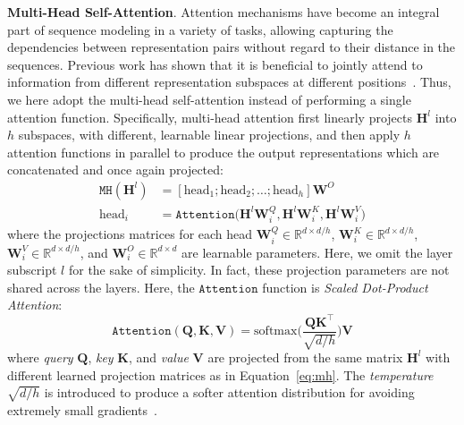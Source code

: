 \textbf{Multi-Head Self-Attention}.
Attention mechanisms have become an integral part of sequence modeling in a variety of tasks, allowing capturing the dependencies between representation pairs without regard to their distance in the sequences.
Previous work has shown that it is beneficial to jointly attend to information from different representation subspaces at different positions~\cite{Vaswani:nips2017:Attention,Li:emnlp2018:Multi,Devlin:2018:BERT}.
Thus, we here adopt the multi-head self-attention instead of performing a single attention function.
Specifically, multi-head attention first linearly projects $\bm{H}^l$ into $h$ subspaces, with different, learnable linear projections, and then apply $h$ attention functions in parallel to produce the output representations which are concatenated and once again projected:
\begin{equation}
    \begin{aligned}
        \mathtt{MH}(\bm{H}^{l}) &= [\text{head}_1; \text{head}_2; \dots; \text{head}_h]\bm{W}^{O} \\
        \text{head}_i &= \mathtt{Attention}\bigl(\bm{H}^l\bm{W}_i^Q, \bm{H}^l\bm{W}_i^K, \bm{H}^l\bm{W}_i^V \bigr)
    \end{aligned}
\label{eq:mh}
\end{equation} %
where the projections matrices for each head $\bm{W}_i^Q \in \mathbb{R}^{d \times d/h}$, $\bm{W}_i^K \in \mathbb{R}^{d \times d/h}$, $\bm{W}_i^V \in \mathbb{R}^{d \times d/h}$, and $\bm{W}_i^O \in \mathbb{R}^{d \times d}$ are learnable parameters. %
Here, we omit the layer subscript $l$ for the sake of simplicity.
In fact, these projection parameters are not shared across the layers.
Here, the $\mathtt{Attention}$ function is \textit{Scaled Dot-Product Attention}: %
\begin{equation}
    \mathtt{Attention}(\bm{Q}, \bm{K}, \bm{V}) = \mathrm{softmax} \biggl(\frac{\bm{Q}\bm{K}^{\top}}{\sqrt{d/h}}\biggr) \bm{V}
    \label{eq:scale_dot}
\end{equation}
where \textit{query} $\bm{Q}$, \textit{key} $\bm{K}$, and \textit{value} $\bm{V}$ are projected from the same matrix $\bm{H}^l$ with different learned projection matrices as in Equation~\ref{eq:mh}. %
The \textit{temperature} $\sqrt{d/h}$ is introduced to produce a softer attention distribution for avoiding extremely small gradients~\cite{Hinton:nips2014:Distilling,Vaswani:nips2017:Attention}.


